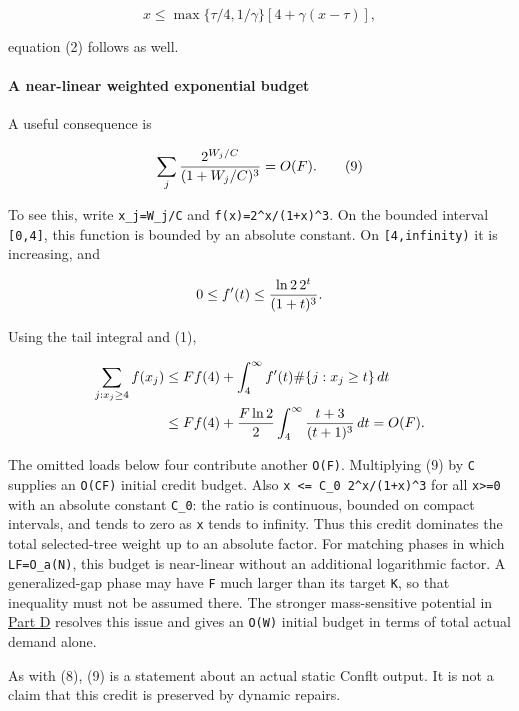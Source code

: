 \[
x\le \max\{\tau/4,1/\gamma\}
            [4+\gamma(x-\tau)],
\]

equation (2) follows as well.

\hypertarget{af-385fd70686-a-near-linear-weighted-exponential-budget}{%
\paragraph{A near-linear weighted exponential budget}\label{af-385fd70686-a-near-linear-weighted-exponential-budget}}

A useful consequence is

\[
\sum_j {2^{W_j/C}\over(1+W_j/C)^3}=O(F).          \tag{9}
\]

To see this, write \texttt{x\_j=W\_j/C} and \texttt{f(x)=2\^{}x/(1+x)\^{}3}. On the bounded interval \texttt{{[}0,4{]}}, this function is bounded by an absolute constant. On \texttt{{[}4,infinity)} it is increasing, and

\[
0\le f'(t)\le {\ln2\,2^t\over(1+t)^3}.
\]

Using the tail integral and (1),

\[
\begin{aligned}
\sum_{j:x_j\ge4}f(x_j)
&\le F f(4)+\int_4^\infty f'(t)\#\{j:x_j\ge t\}\,dt\\
&\le F f(4)+{F\ln2\over2}
                 \int_4^\infty {t+3\over(t+1)^3}\,dt
=O(F).
\end{aligned}
\]

The omitted loads below four contribute another \texttt{O(F)}. Multiplying (9) by \texttt{C} supplies an \texttt{O(CF)} initial credit budget. Also \texttt{x\ \textless{}=\ C\_0\ 2\^{}x/(1+x)\^{}3} for all \texttt{x\textgreater{}=0} with an absolute constant \texttt{C\_0}: the ratio is continuous, bounded on compact intervals, and tends to zero as \texttt{x} tends to infinity. Thus this credit dominates the total selected-tree weight up to an absolute factor. For matching phases in which \texttt{LF=O\_a(N)}, this budget is near-linear without an additional logarithmic factor. A generalized-gap phase may have \texttt{F} much larger than its target \texttt{K}, so that inequality must not be assumed there. The stronger mass-sensitive potential in \protect\hyperlink{af-385fd70686-mass-sensitive-tail}{Part D} resolves this issue and gives an \texttt{O(W)} initial budget in terms of total actual demand alone.

As with (8), (9) is a statement about an actual static Conflt output. It is not a claim that this credit is preserved by dynamic repairs.

